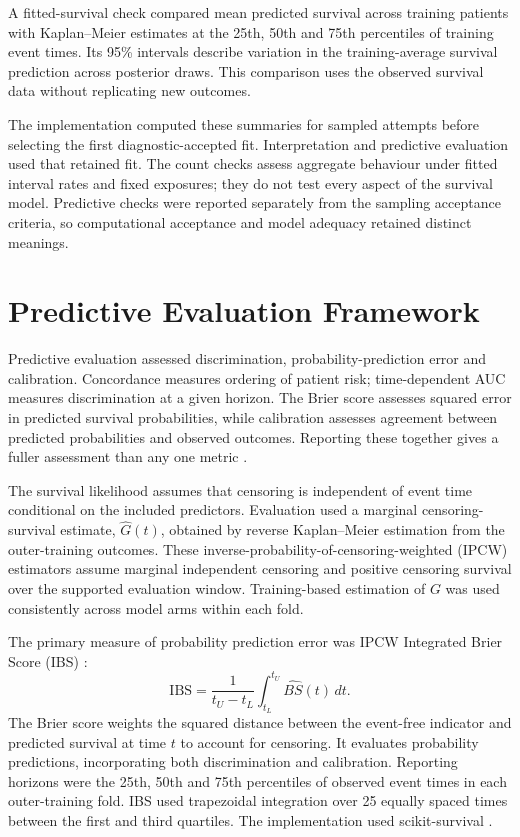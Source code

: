 A fitted-survival check compared mean predicted survival across training patients with Kaplan--Meier estimates \cite{kaplan1958} at the 25th, 50th and 75th percentiles of training event times. Its 95\% intervals describe variation in the training-average survival prediction across posterior draws. This comparison uses the observed survival data without replicating new outcomes.

The implementation computed these summaries for sampled attempts before selecting the first diagnostic-accepted fit. Interpretation and predictive evaluation used that retained fit. The count checks assess aggregate behaviour under fitted interval rates and fixed exposures; they do not test every aspect of the survival model. Predictive checks were reported separately from the sampling acceptance criteria, so computational acceptance and model adequacy retained distinct meanings.

\section{Predictive Evaluation Framework}\label{predictive-evaluation-framework}

Predictive evaluation assessed discrimination, probability-prediction error and calibration. Concordance measures ordering of patient risk; time-dependent AUC measures discrimination at a given horizon. The Brier score assesses squared error in predicted survival probabilities, while calibration assesses agreement between predicted probabilities and observed outcomes. Reporting these together gives a fuller assessment than any one metric \cite{ref26,ref27,ref59}.

The survival likelihood assumes that censoring is independent of event time conditional on the included predictors. Evaluation used a marginal censoring-survival estimate, $\widehat G(t)$, obtained by reverse Kaplan--Meier estimation from the outer-training outcomes. These inverse-probability-of-censoring-weighted (IPCW) estimators assume marginal independent censoring and positive censoring survival over the supported evaluation window. Training-based estimation of $G$ was used consistently across model arms within each fold.

The primary measure of probability prediction error was IPCW Integrated Brier Score (IBS) \cite{graf1999}:
\begin{equation}
\mathrm{IBS}=\frac{1}{t_U-t_L}\int_{t_L}^{t_U}\widehat{BS}(t)\,dt.
\end{equation}
The Brier score weights the squared distance between the event-free indicator and predicted survival at time $t$ to account for censoring. It evaluates probability predictions, incorporating both discrimination and calibration. Reporting horizons were the 25th, 50th and 75th percentiles of observed event times in each outer-training fold. IBS used trapezoidal integration over 25 equally spaced times between the first and third quartiles. The implementation used scikit-survival \cite{polsterl2020}.

